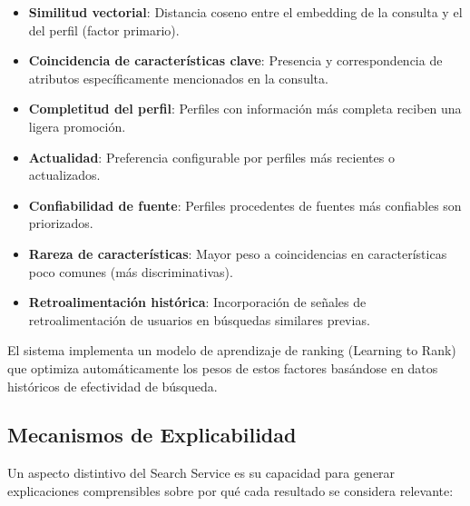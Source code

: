 \documentclass[12pt,a4paper]{article}
\begin{document}
\begin{itemize}
    \item \textbf{Similitud vectorial}: Distancia coseno entre el embedding de la consulta y el del perfil (factor primario).
    
    \item \textbf{Coincidencia de características clave}: Presencia y correspondencia de atributos específicamente mencionados en la consulta.
    
    \item \textbf{Completitud del perfil}: Perfiles con información más completa reciben una ligera promoción.
    
    \item \textbf{Actualidad}: Preferencia configurable por perfiles más recientes o actualizados.
    
    \item \textbf{Confiabilidad de fuente}: Perfiles procedentes de fuentes más confiables son priorizados.
    
    \item \textbf{Rareza de características}: Mayor peso a coincidencias en características poco comunes (más discriminativas).
    
    \item \textbf{Retroalimentación histórica}: Incorporación de señales de retroalimentación de usuarios en búsquedas similares previas.
\end{itemize}

El sistema implementa un modelo de aprendizaje de ranking (Learning to Rank) que optimiza automáticamente los pesos de estos factores basándose en datos históricos de efectividad de búsqueda.

\subsection{Mecanismos de Explicabilidad}
\label{subsec:ss-explicabilidad}

Un aspecto distintivo del Search Service es su capacidad para generar explicaciones comprensibles sobre por qué cada resultado se considera relevante:
\end{document}
